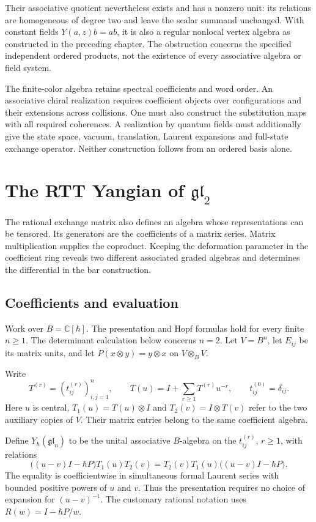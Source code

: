 Their associative quotient nevertheless exists and has a nonzero unit:
its relations are homogeneous of degree two and leave the scalar summand
unchanged.  With constant fields $Y(a,z)b=ab$, it is also a regular
nonlocal vertex algebra as constructed in the preceding chapter.
The obstruction concerns the specified independent ordered products,
not the existence of every associative algebra or field system.

The finite-color algebra retains spectral coefficients and word order.
An associative chiral realization requires coefficient objects over
configurations and their extensions across collisions.  One must also
construct the substitution maps with all required coherences.  A realization
by quantum fields must additionally give the state space, vacuum,
translation, Laurent expansions and full-state exchange operator.
Neither construction follows from an ordered basis alone.

\chapter{The RTT Yangian of \texorpdfstring{$\mathfrak{gl}_2$}{gl2}}

The rational exchange matrix also defines an algebra whose representations
can be tensored.  Its generators are the coefficients of a matrix series.
Matrix multiplication supplies the coproduct.  Keeping the deformation
parameter in the coefficient ring reveals two different associated graded
algebras and determines the differential in the bar construction.

\section{Coefficients and evaluation}

Work over $B=\mathbb C[\hbar]$.  The presentation and Hopf formulas hold
for every finite $n\geq1$.  The determinant calculation below concerns
$n=2$.  Let $V=B^n$, let $E_{ij}$ be its matrix units, and let
$P(x\otimes y)=y\otimes x$ on $V\otimes_B V$.

Write
\[
 T^{(r)}=(t_{ij}^{(r)})_{i,j=1}^n,\qquad
 T(u)=I+\sum_{r\geq1}T^{(r)}u^{-r},\qquad
 t_{ij}^{(0)}=\delta_{ij}.
\]
Here $u$ is central, $T_1(u)=T(u)\otimes I$ and
$T_2(v)=I\otimes T(v)$ refer to the two auxiliary copies of $V$.
Their matrix entries belong to the same coefficient algebra.

Define $Y_\hbar(\mathfrak{gl}_n)$ to be the unital associative
$B$-algebra on the $t_{ij}^{(r)}$, $r\geq1$, with relations
\begin{equation}\label{cbc:rtt:cleared}
 \bigl((u-v)I-\hbar P\bigr)T_1(u)T_2(v)
 =T_2(v)T_1(u)\bigl((u-v)I-\hbar P\bigr).
\end{equation}
The equality is coefficientwise in simultaneous formal Laurent series
with bounded positive powers of $u$ and $v$.  Thus the presentation
requires no choice of expansion for $(u-v)^{-1}$.
The customary rational notation uses $R(w)=I-\hbar P/w$.

